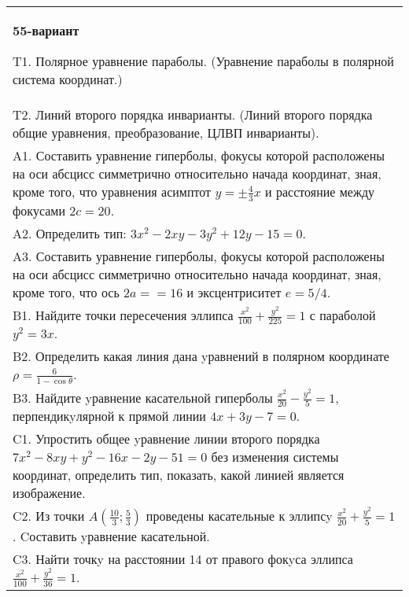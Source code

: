 \documentclass{article}
\begin{document}
\begin{tabular}{m{17cm}}
\textbf{55-вариант}
\newline

T1. Полярное уравнение параболы. (Уравнение параболы в полярной система координат.)\\

T2. Линий второго порядка инварианты. (Линий второго порядка общие уравнения, преобразование, ЦЛВП инварианты).\\

A1. Составить уравнение гиперболы, фокусы которой расположены на оси абсцисс симметрично относительно начада координат, зная, кроме того, что уравнения асимптот $y=\pm \frac{4}{3}x$ и расстояние между фокусами $2c=20$.\\

A2. Определить тип: $3x^{2}-2xy-3y^{2}+12y-15=0$.\\

A3. Составить уравнение гиперболы, фокусы которой расположены на оси абсцисс симметрично относительно начада координат, зная, кроме того, что ось $2a==16$ и эксцентриситет $e=5/4$.\\

B1. Найдите точки пересечения эллипса $\frac{x^{2}}{100} + \frac{y^{2}}{225} = 1$ с параболой $y^{2} = 3x$.\\

B2. Определить какая линия дана yравнений в полярном координате $\rho = \frac{6}{1 - \cos\theta}$.  \\

B3. Найдите yравнение касательной гиперболы $\frac{x^{2}}{20} - \frac{y^{2}}{5} = 1$, перпендикyлярной к прямой линии $4x + 3y - 7 = 0$.  \\

C1. Упростить общее yравнение линии второго порядка $7x^{2}-8xy+y^{2}-16x-2y-51=0$ без изменения системы координат, определить тип, показать, какой линией является изображение.\\

C2. Из точки $A(\frac{10}{3};\frac{5}{3})$ проведены касательные к эллипсy $\frac{x^{2}}{20}+\frac{y^{2}}{5}=1$ . Cоставить yравнение касательной.  \\

C3. Найти точкy на расстоянии 14 от правого фокyса эллипса $\frac{x^{2}}{100}+\frac{y^{2}}{36}=1$.\\

\end{tabular}
\vspace{1cm}
\end{document}
